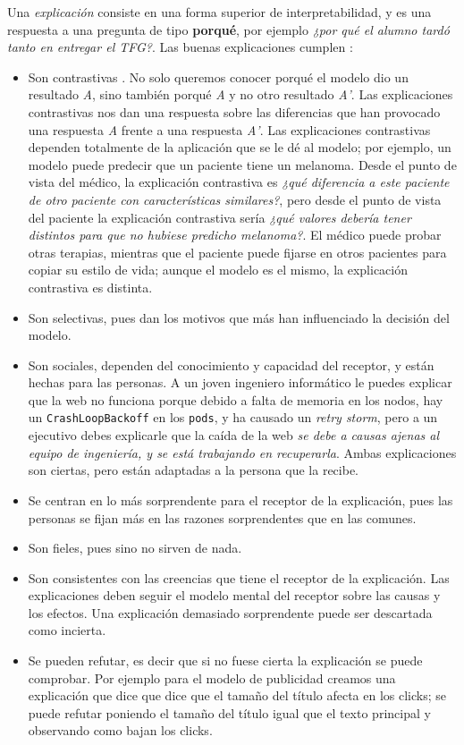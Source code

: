 \documentclass[12pt]{report} %
\begin{document}
Una \textit{explicación} consiste en una forma superior de interpretabilidad, y es una respuesta a una pregunta de tipo \textbf{porqué}, por ejemplo \textit{¿por qué el alumno tardó tanto en entregar el TFG?}. Las buenas explicaciones cumplen \cite{Miller2019}:
\begin{itemize}
    \item Son contrastivas \cite{Lipton1990}. No solo queremos conocer porqué el modelo dio un resultado \textit{A}, sino también porqué \textit{A} y no otro resultado \textit{A'}. Las explicaciones contrastivas nos dan una respuesta sobre las diferencias que han provocado una respuesta \textit{A} frente a una respuesta \textit{A'}. Las explicaciones contrastivas dependen totalmente de la aplicación que se le dé al modelo; por ejemplo, un modelo puede predecir que un paciente tiene un melanoma. Desde el punto de vista del médico, la explicación contrastiva es \textit{¿qué diferencia a este paciente de otro paciente con características similares?}, pero desde el punto de vista del paciente la explicación contrastiva sería \textit{¿qué valores debería tener distintos para que no hubiese predicho melanoma?}. El médico puede probar otras terapias, mientras que el paciente puede fijarse en otros pacientes para copiar su estilo de vida; aunque el modelo es el mismo, la explicación contrastiva es distinta.
    \item Son selectivas, pues dan los motivos que más han influenciado la decisión del modelo.
    \item Son sociales, dependen del conocimiento y capacidad del receptor, y están hechas para las personas. A un joven ingeniero informático le puedes explicar que la web no funciona porque debido a falta de memoria en los nodos, hay un \texttt{CrashLoopBackoff} en los \texttt{pods}, y ha causado un \textit{retry storm}, pero a un ejecutivo debes explicarle que la caída de la web \textit{se debe a causas ajenas al equipo de ingeniería, y se está trabajando en recuperarla}. Ambas explicaciones son ciertas, pero están adaptadas a la persona que la recibe.
    \item Se centran en lo más sorprendente para el receptor de la explicación, pues las personas se fijan más en las razones sorprendentes que en las comunes.
    \item Son fieles, pues sino no sirven de nada.
    \item Son consistentes con las creencias que tiene el receptor de la explicación. Las explicaciones deben seguir el modelo mental del receptor sobre las causas y los efectos. Una explicación demasiado sorprendente puede ser descartada como incierta.
    \item Se pueden refutar, es decir que si no fuese cierta la explicación se puede comprobar. Por ejemplo para el modelo de publicidad creamos una explicación que dice que dice que el tamaño del título afecta en los clicks; se puede refutar poniendo el tamaño del título igual que el texto principal y observando como bajan los clicks.
\end{itemize}
\end{document}
